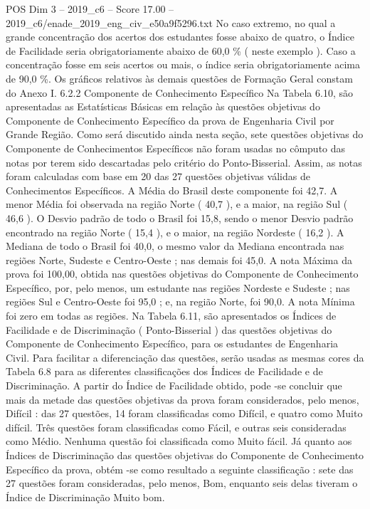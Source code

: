 \begin{textsample}{POS Dim 3 – 2019\_c6 – Score 17.00 – 2019\_c6/enade\_2019\_eng\_civ\_e50a9f5296.txt}
No caso extremo, no qual a grande concentração dos acertos dos estudantes fosse abaixo de quatro, o Índice de Facilidade seria obrigatoriamente abaixo de 60,0 \% ( neste exemplo ).
Caso a concentração fosse em seis acertos ou mais, o índice seria obrigatoriamente acima de 90,0 \%.
Os gráficos relativos às demais questões de Formação Geral constam do Anexo I. 6.2.2 Componente de Conhecimento Específico Na Tabela 6.10, são apresentadas as Estatísticas Básicas em relação às questões objetivas do Componente de Conhecimento Específico da prova de Engenharia Civil por Grande Região.
Como será discutido ainda nesta seção, sete questões objetivas do Componente de Conhecimentos Específicos não foram usadas no cômputo das notas por terem sido descartadas pelo critério do Ponto-Bisserial.
Assim, as notas foram calculadas com base em 20 das 27 questões objetivas válidas de Conhecimentos Específicos.
A Média do Brasil deste componente foi 42,7.
A menor Média foi observada na região Norte ( 40,7 ), e a maior, na região Sul ( 46,6 ).
O Desvio padrão de todo o Brasil foi 15,8, sendo o menor Desvio padrão encontrado na região Norte ( 15,4 ), e o maior, na região Nordeste ( 16,2 ).
A Mediana de todo o Brasil foi 40,0, o mesmo valor da Mediana encontrada nas regiões Norte, Sudeste e Centro-Oeste ; nas demais foi 45,0.
A nota Máxima da prova foi 100,00, obtida nas questões objetivas do Componente de Conhecimento Específico, por, pelo menos, um estudante nas regiões Nordeste e Sudeste ; nas regiões Sul e Centro-Oeste foi 95,0 ; e, na região Norte, foi 90,0.
A nota Mínima foi zero em todas as regiões.
Na Tabela 6.11, são apresentados os Índices de Facilidade e de Discriminação ( Ponto-Bisserial ) das questões objetivas do Componente de Conhecimento Específico, para os estudantes de Engenharia Civil.
Para facilitar a diferenciação das questões, serão usadas as mesmas cores da Tabela 6.8 para as diferentes classificações dos Índices de Facilidade e de Discriminação.
A partir do Índice de Facilidade obtido, pode -se concluir que mais da metade das questões objetivas da prova foram considerados, pelo menos, Difícil : das 27 questões, 14 foram classificadas como Difícil, e quatro como Muito difícil.
Três questões foram classificadas como Fácil, e outras seis consideradas como Médio.
Nenhuma questão foi classificada como Muito fácil.
Já quanto aos Índices de Discriminação das questões objetivas do Componente de Conhecimento Específico da prova, obtém -se como resultado a seguinte classificação : sete das 27 questões foram consideradas, pelo menos, Bom, enquanto seis delas tiveram o Índice de Discriminação Muito bom.

\end{textsample}
